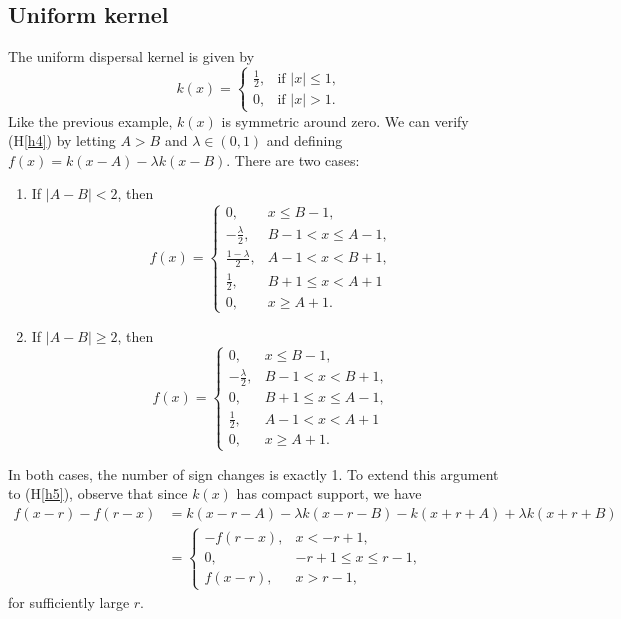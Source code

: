 \documentclass[11pt]{article}
\theoremstyle{definition}
\numberwithin{equation}{section}
\numberwithin{thm}{section}
\newcommand{\hypref}[1]{{(H{\ref{#1}})}}
\begin{document}
\subsection{Uniform kernel}
The uniform dispersal kernel is given by
\begin{equation}
k(x) = \begin{cases}
\frac{1}{2}, & \text{if } |x|\leq 1, \\
0, & \text{if } |x| > 1.
\end{cases} \end{equation}
Like the previous example, $k(x)$ is symmetric around zero.
We can verify \hypref{h4} by letting $A>B$ and $\lambda \in (0,1)$ and defining $f(x)=k(x-A)-\lambda k(x-B)$.
There are two cases:
\begin{enumerate}[{Case} 1.]
\item If $|A-B|<2$, then
$$
f(x) = \begin{cases}
0, & x \leq B-1, \\
-\frac{\lambda}{2}, & B-1 < x \leq A-1, \\
\frac{1-\lambda}{2}, & A-1 < x < B+1, \\
\frac{1}{2}, & B+1 \leq x < A+1 \\
0, & x \geq A+1.
\end{cases}
$$

\item If $|A-B| \geq 2$, then
$$
f(x) = \begin{cases}
0, & x \leq B-1, \\
-\frac{\lambda}{2}, & B-1 < x < B+1, \\
0, & B+1 \leq x \leq A-1, \\
\frac{1}{2}, & A-1 < x < A+1 \\
0, & x \geq A+1.
\end{cases}
$$
\end{enumerate}
In both cases, the number of sign changes is exactly 1.
To extend this argument to \hypref{h5}, observe that since $k(x)$ has compact support, we have
$$
\begin{aligned}
f(x-r) - f(r-x) &= k(x-r-A) - \lambda k(x-r-B) - k(x+r+A) + \lambda k(x+r+B) \\
&= \begin{cases}
-f(r-x), & x < -r+1, \\
0, & -r+1 \leq x \leq r-1, \\
f(x-r), & x > r-1,
\end{cases}
\end{aligned}
$$
for sufficiently large $r$.
\end{document}
